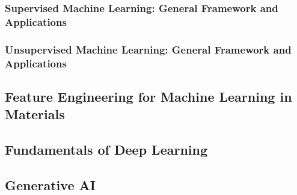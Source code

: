 \documentclass[%
aip,
rmp,
10pt, 
amsmath,
amssymb,
floatfix,
nofootinbib,
]{revtex4-2}
\begin{document}
\subsubsection{Supervised Machine Learning: General Framework and Applications}
\label{sec:supervised_ML}


\subsubsection{Unsupervised Machine Learning: General Framework and Applications}
\label{sec:unsupervised_ML}




\subsection{Feature Engineering for Machine Learning in Materials}\label{sec:feature_eng}


\subsection{Fundamentals of Deep Learning}\label{sec:dl_fundamentals}


\subsection{Generative AI}\label{sec:generative_AI}


%

\end{document}
